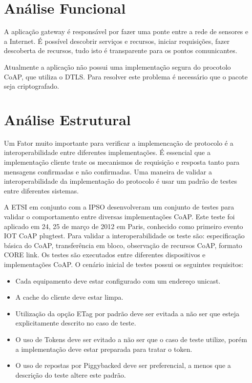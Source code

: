 \section{An\'alise Funcional}

A aplica\c{c}\~ao gateway \'e respons\'avel por fazer uma ponte entre a rede de sensores e a Internet. \'E poss\'ivel descobrir servi\c{c}os e recursos, iniciar requisi\c{c}\~oes, fazer descoberta de recursos, tudo  isto \'e transparente para os pontos comunicantes.

Atualmente a aplica\c{c}\~ao n\~ao possui uma implementa\c{c}\~ao segura do procotolo CoAP, que utiliza o DTLS. Para resolver este problema \'e necess\'ario que o pacote seja criptografado.

\section{An\'alise Estrutural}

Um Fator muito importante para verificar a implemenca\c{c}\~ao de protocolo \'e a interoperabilidade entre diferentes implementa\c{c}\~oes. \'E essencial que a implementa\c{c}\~ao cliente trate os mecanismos de requisi\c{c}\~ao e resposta tanto para mensagens confirmadas e n\~ao confirmadas. Uma maneira de validar a interoperabilidade da implementa\c{c}\~ao do protocolo \'e usar um padr\~ao de testes entre diferentes sistemas.

A ETSI em conjunto com a IPSO desenvolveram um conjunto de testes para validar o comportamento entre diversas implementa\c{c}\~oes CoAP. Este teste foi aplicado em 24, 25 de mar\c{c}o de 2012 em Paris, conhecido como primeiro evento IOT CoAP plugtest. Para validar a interoperabilidade os teste s\~ao: especifica\c{c}\~ao b\'asica do CoAP, transfer\^encia em bloco, observa\c{c}\~ao de recursos CoAP, formato CORE link. Os testes s\~ao executados entre diferentes dispositivos e implementa\c{c}\~oes CoAP. O cen\'ario inicial de testes possui os seguintes requisitos:
\begin{itemize}
    \item Cada equipamento deve estar configurado com um endere\c{c}o unicast.
    \item A cache do cliente deve estar limpa.
    \item Utiliza\c{c}\~ao da op\c{c}\~ao ETag por padr\~ao deve ser evitada a n\~ao ser que esteja explicitamente descrito no caso de teste. 
    \item O uso de Tokens deve ser evitado a n\~ao ser que o caso de teste utilize, por\'em a implementa\c{c}\~ao deve estar preparada para tratar o token.
    \item O uso de repostas por Piggybacked deve ser preferencial, a menos que a descri\c{c}\~ao do teste altere este padr\~ao.
\end{itemize}

